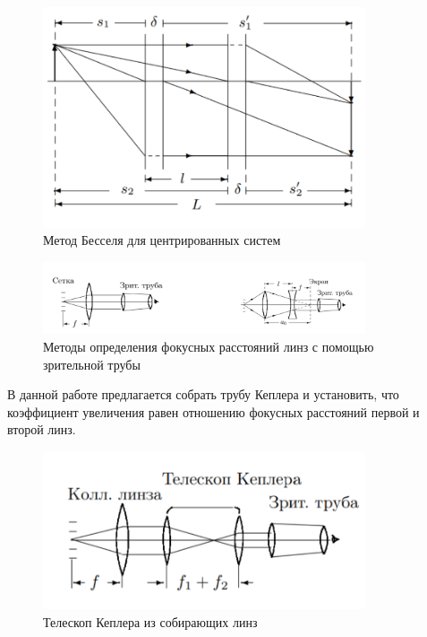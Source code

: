 \documentclass[a4paper, 12pt]{article}%
\begin{document}
	\begin{figure}[H]
		\begin{center}
			\includegraphics[width = 0.85\textwidth]{bessel.png}
			\caption{Метод Бесселя для центрированных систем}
		\end{center}
	\end{figure}
	
	\newpage
	
	\begin{figure}[H]
		\begin{center}
			\includegraphics[width = 0.85\textwidth]{линзы.png}
			\caption{Методы определения фокусных расстояний линз с помощью зрительной трубы}
		\end{center}
	\end{figure}
	
	В данной работе предлагается собрать трубу Кеплера и установить, что коэффициент увеличения равен отношению фокусных расстояний первой и второй линз.
	
	\begin{figure}[H]
		\begin{center}
			\includegraphics[width = 0.85\textwidth]{kepler.png}
			\caption{Телескоп Кеплера из собирающих линз}
		\end{center}
	\end{figure}  
\end{document}
